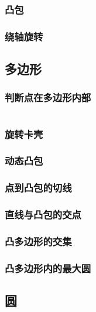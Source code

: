 \documentclass[a4paper]{article}
\newcommand{\cppcode}[1]{
    \inputminted[mathescape]{cpp}{source/#1}
}
\begin{document}
\subsubsection{凸包}

\subsubsection{绕轴旋转}

\subsection{多边形}

\subsubsection{判断点在多边形内部}

\cppcode{computational-geometry/point-in-polygon.cpp}

\subsubsection{旋转卡壳}

\subsubsection{动态凸包}

\subsubsection{点到凸包的切线}

\subsubsection{直线与凸包的交点}

\subsubsection{凸多边形的交集}

\subsubsection{凸多边形内的最大圆}

\subsection{圆}
\end{document}
